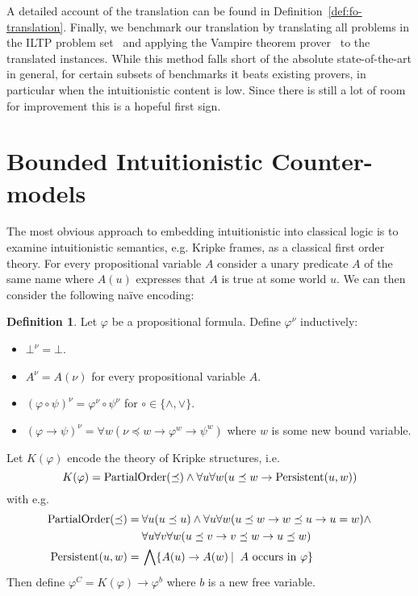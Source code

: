 \documentclass{easychair}
\theoremstyle{definition}
\theoremstyle{definition}
\theoremstyle{definition}
\theoremstyle{definition}
\theoremstyle{definition}
\newtheorem{definition}[theorem]{Definition}
\theoremstyle{definition}
\theoremstyle{definition}
\begin{document}
A detailed account of the translation can be found in Definition~\ref{def:fo-translation}. Finally, we benchmark our translation by translating all problems in the ILTP problem set~\cite{iltp} and applying the Vampire theorem prover~\cite{kovacs2013first} to the translated instances. While this method falls short of the absolute state-of-the-art in general, for certain subsets of benchmarks it beats existing provers, in particular when the intuitionistic content is low. Since there is still a lot of room for improvement this is a hopeful first sign.


\section{Bounded Intuitionistic Counter-models}

The most obvious approach to embedding intuitionistic into classical logic is to examine intuitionistic semantics, e.g. Kripke frames, as a classical first order theory. For every propositional variable $A$ consider a unary predicate $A$ of the same name where $A(u)$ expresses that $A$ is true at some world $u$. We can then consider the following naïve encoding:

\begin{definition}
	Let $\varphi$ be a propositional formula.
 Define $\varphi^{\nu}$ inductively:
	\vspace*{-.1cm}
	\begin{itemize}
		\item $\bot^\nu = \bot$.
		\item $A^{\nu} = A(\nu)$ for every propositional variable $A$.
		\item $(\varphi\circ\psi)^\nu = \varphi^\nu\circ\psi^\nu$ for $\circ\in\{\wedge, \vee\}$.
		\item $(\varphi\to \psi)^\nu = \forall w(\nu\preceq w\to\varphi^{w}\to\psi^{w})$ where $w$ is some new bound variable.
	\end{itemize}
	Let $K(\varphi)$ encode the theory of Kripke structures, i.e.
	\vspace*{-.1cm}
	\[K(\varphi) = \text{\normalfont PartialOrder}(\preceq)\wedge\forall u\forall w(u\preceq w\to \text{\normalfont Persistent}(u, w))\]
	\vspace*{-.4cm}
	with e.g.
	\vspace*{-.2cm}
	\begin{align*}
		\text{\normalfont PartialOrder}(\preceq) =&\:\forall u(u\preceq u)\wedge\forall u\forall w(u\preceq w\to w\preceq u\to u = w)\wedge\\&\:\forall u\forall v\forall w(u\preceq v\to v\preceq w\to u\preceq w)\\
		\text{\normalfont Persistent}(u, w)=&\:\bigwedge \{A(u)\to A(w)\:|\: \text{ $A$ occurs in $\varphi$}\}
	\end{align*}
	Then define
	$\varphi^{C} = K(\varphi)\to \varphi^{b}$
	where $b$ is a new free variable.
\end{definition}
\end{document}
